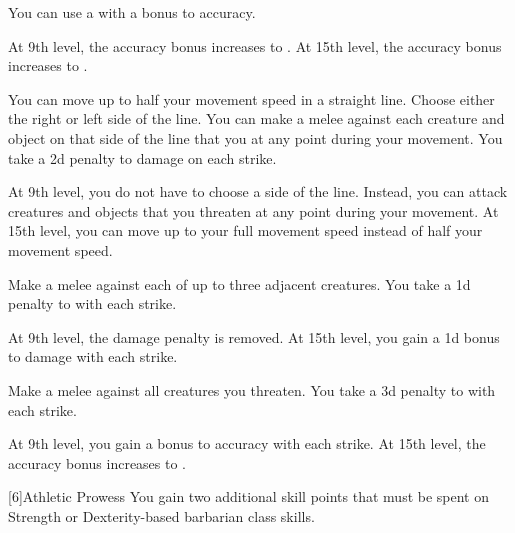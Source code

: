 {             You can use a  with a  bonus to accuracy.

            At 9th level, the accuracy bonus increases to .
            At 15th level, the accuracy bonus increases to .

             You can move up to half your movement speed in a straight line.
            Choose either the right or left side of the line.
            You can make a melee  against each creature and object on that side of the line that you  at any point during your movement.
            You take a \minus2d penalty to damage on each strike.

            At 9th level, you do not have to choose a side of the line.
            Instead, you can attack creatures and objects that you threaten at any point during your movement.
            At 15th level, you can move up to your full movement speed instead of half your movement speed.

             Make a melee  against each of up to three adjacent creatures.
            You take a \minus1d penalty to  with each strike.

            At 9th level, the damage penalty is removed.
            At 15th level, you gain a \plus1d bonus to damage with each strike.

             Make a melee  against all creatures you threaten.
            You take a \minus3d penalty to  with each strike.

            At 9th level, you gain a  bonus to accuracy with each strike.
            At 15th level, the accuracy bonus increases to .
        }

        [6]{Athletic Prowess} You gain two additional skill points that must be spent on Strength or Dexterity-based barbarian class skills.


